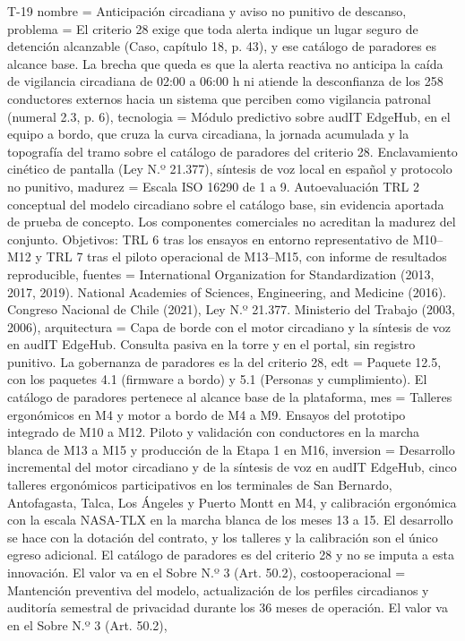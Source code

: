 \begin{formulario}{T-19}
{  nombre = {Anticipación circadiana y aviso no punitivo de descanso},
  problema = {El criterio 28 exige que toda alerta indique un lugar seguro de detención alcanzable (Caso, capítulo 18, p. 43), y ese catálogo de paradores es alcance base. La brecha que queda es que la alerta reactiva no anticipa la caída de vigilancia circadiana de 02:00 a 06:00 h ni atiende la desconfianza de los 258 conductores externos hacia un sistema que perciben como vigilancia patronal (numeral 2.3, p. 6)},
  tecnologia = {Módulo predictivo sobre audIT EdgeHub, en el equipo a bordo, que cruza la curva circadiana, la jornada acumulada y la topografía del tramo sobre el catálogo de paradores del criterio 28. Enclavamiento cinético de pantalla (Ley N.º 21.377), síntesis de voz local en español y protocolo no punitivo},
  madurez = {Escala ISO 16290 de 1 a 9. Autoevaluación TRL 2 conceptual del modelo circadiano sobre el catálogo base, sin evidencia aportada de prueba de concepto. Los componentes comerciales no acreditan la madurez del conjunto. Objetivos: TRL 6 tras los ensayos en entorno representativo de M10--M12 y TRL 7 tras el piloto operacional de M13--M15, con informe de resultados reproducible},
  fuentes = {International Organization for Standardization (2013, 2017, 2019). National Academies of Sciences, Engineering, and Medicine (2016). Congreso Nacional de Chile (2021), Ley N.º 21.377. Ministerio del Trabajo (2003, 2006)},
  arquitectura = {Capa de borde con el motor circadiano y la síntesis de voz en audIT EdgeHub. Consulta pasiva en la torre y en el portal, sin registro punitivo. La gobernanza de paradores es la del criterio 28},
  edt = {Paquete 12.5, con los paquetes 4.1 (firmware a bordo) y 5.1 (Personas y cumplimiento). El catálogo de paradores pertenece al alcance base de la plataforma},
  mes = {Talleres ergonómicos en M4 y motor a bordo de M4 a M9. Ensayos del prototipo integrado de M10 a M12. Piloto y validación con conductores en la marcha blanca de M13 a M15 y producción de la Etapa 1 en M16},
  inversion = {Desarrollo incremental del motor circadiano y de la síntesis de voz en audIT EdgeHub, cinco talleres ergonómicos participativos en los terminales de San Bernardo, Antofagasta, Talca, Los Ángeles y Puerto Montt en M4, y calibración ergonómica con la escala NASA-TLX en la marcha blanca de los meses 13 a 15. El desarrollo se hace con la dotación del contrato, y los talleres y la calibración son el único egreso adicional. El catálogo de paradores es del criterio 28 y no se imputa a esta innovación. El valor va en el Sobre N.º 3 (Art. 50.2)},
  costooperacional = {Mantención preventiva del modelo, actualización de los perfiles circadianos y auditoría semestral de privacidad durante los 36 meses de operación. El valor va en el Sobre N.º 3 (Art. 50.2)},
}
\end{formulario}
